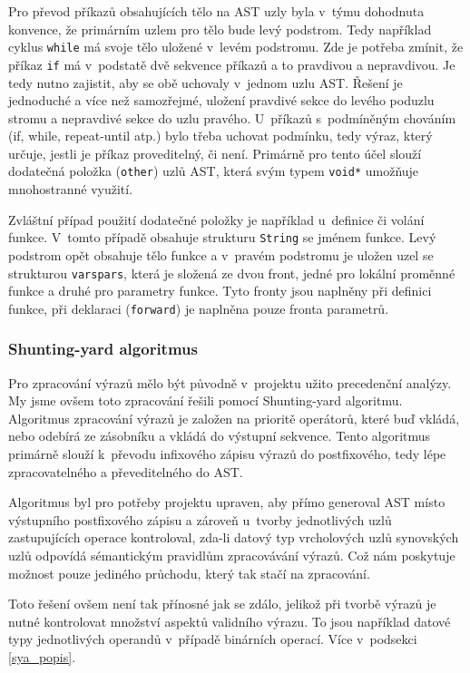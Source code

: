 \documentclass[12pt,a4paper,titlepage,final]{article}
\begin{document}
Pro převod příkazů obsahujících tělo na AST uzly byla v~týmu dohodnuta konvence,
že primárním uzlem pro tělo bude levý podstrom. Tedy například cyklus \verb|while|
má svoje tělo uložené v~levém podstromu. Zde je potřeba zmínit, že příkaz \verb|if|
má v~podstatě dvě sekvence příkazů a to pravdivou a nepravdivou. Je tedy nutno
zajistit, aby se obě uchovaly v~jednom uzlu AST. Řešení je jednoduché a více než samozřejmé, uložení pravdivé sekce do levého
poduzlu stromu a nepravdivé sekce do uzlu pravého. U~příkazů s~podmíněným
chováním (if, while, repeat-until atp.) bylo třeba uchovat podmínku, tedy výraz,
který určuje, jestli je příkaz proveditelný, či není. Primárně pro tento účel
slouží dodatečná položka (\verb|other|) uzlů AST, která svým typem \verb|void*| umožňuje
mnohostranné využití. 

Zvláštní případ použití dodatečné položky je například u~definice či volání funkce.
V~tomto případě obsahuje strukturu \verb|String| se jménem funkce. Levý podstrom
opět obsahuje tělo funkce a v~pravém podstromu je uložen uzel se strukturou \verb|varspars|,
která je složená ze dvou front, jedné pro lokální proměnné funkce a druhé pro
parametry funkce. Tyto fronty jsou naplněny při definici funkce, při deklaraci
(\verb|forward|) je naplněna pouze fronta parametrů.

\subsubsection{Shunting-yard algoritmus} \label{sya}
Pro zpracování výrazů mělo být původně v~projektu užito precedenční analýzy. My jsme ovšem toto zpracování řešili pomocí Shunting-yard algoritmu.
Algoritmus zpracování výrazů je založen na prioritě operátorů, které buď vkládá,
nebo odebírá ze zásobníku a vkládá do výstupní sekvence. Tento algoritmus primárně
slouží k~převodu infixového zápisu výrazů do postfixového, tedy lépe zpracovatelného
a převeditelného do AST.

Algoritmus byl pro potřeby projektu upraven, aby přímo generoval AST místo
výstupního postfixového zápisu a zároveň u~tvorby jednotlivých uzlů zastupujících
operace kontroloval, zda-li datový typ vrcholových uzlů synovských uzlů odpovídá
sémantickým pravidlům zpracovávání výrazů. Což nám poskytuje možnost pouze jediného průchodu, který tak stačí na zpracování.

Toto řešení ovšem není tak přínosné jak se zdálo, jelikož při tvorbě výrazů je nutné kontrolovat množství aspektů validního výrazu. To jsou
například datové typy jednotlivých operandů v~případě binárních operací. Více v~podsekci \ref{sya_popis}.
\end{document}
